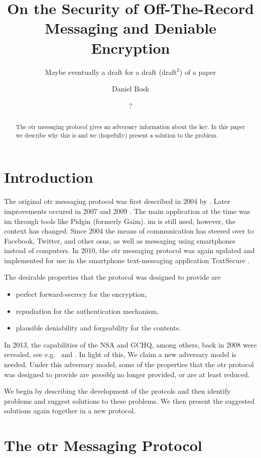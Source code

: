 \documentclass[draft]{llncs}
\title{%
  On the Security of Off-The-Record Messaging
  and Deniable Encryption
}
\subtitle{%
  Maybe eventually a draft for a draft (draft\(^2\)) of a paper
}
\author{%
  Daniel Bosk
  \and
  ?
}
\institute{%
  School of Computer Science and Communication\\
  KTH Royal Institute of Technology, SE-100\,44 Stockholm, Sweden\\
  \email{\{dbosk,?\}@kth.se}
}
\begin{document}
\maketitle
\begin{abstract}
  The \ac{otr} messaging protocol gives an adversary information about the key.
  In this paper we describe why this is and we (hopefully) present a solution 
  to the problem.
\end{abstract}


\acresetall
\section{Introduction}

The original \ac{otr} messaging protocol was first described in 2004 by 
\citeauthor{otr2004} \cite{otr2004}.
Later improvements occured in 2007 \cite{otr2007} and 2009 \cite{multiotr2009}.
The main application at the time was \ac{im} through tools like Pidgin 
\cite{pidgin} (formerly Gaim).
\ac{im} is still used, however, the context has changed.
Since 2004 the means of communication has steered over to Facebook, Twitter, 
and other \acp{osn}, as well as messaging using smartphones instead of 
computers.
In 2010, the \ac{otr} messaging protocol was again updated and implemented for
use in the smartphone text-messaging application TextSecure \cite{textsecure}.

The desirable properties that the protocol was designed to provide are
\begin{itemize}
  \item perfect forward-secrecy for the encryption,
  \item repudiation for the authentication mechanism,
  \item plausible deniability and forgeability for the contents.
\end{itemize}
In 2013, the capabilities of the NSA and GCHQ, among others, back in 2008 were 
revealed, see e.g.~\cite{nsa1} and \cite{nsa2}.
In light of this, We claim a new adversary model is needed.
Under this adversary model, some of the properties that the \ac{otr} protocol 
was designed to provide are \emph{possibly} no longer provided, or are at least 
reduced.

We begin by describing the development of the protcols and then identify 
problems and suggest solutions to these problems.
We then present the suggested solutions again together in a new protocol.


\section{The \acs{otr} Messaging Protocol}
\end{document}
